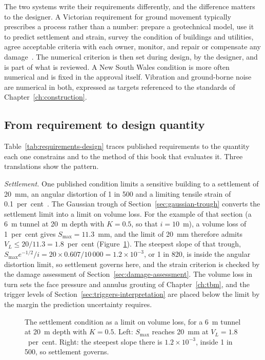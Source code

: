 The two systems write their requirements differently, and the difference
matters to the designer. A Victorian requirement for ground movement typically
prescribes a process rather than a number: prepare a geotechnical model, use
it to predict settlement and strain, survey the condition of buildings and
utilities, agree acceptable criteria with each owner, monitor, and repair or
compensate any damage~\citep{wda2017ees,dtp2022srlassessment}. The numerical
criterion is then set during design, by the designer, and is part of what is
reviewed. A New South Wales condition is more often numerical and is fixed in
the approval itself. Vibration and ground-borne noise are numerical in both,
expressed as targets referenced to the standards of
Chapter~\ref{ch:construction}.

\subsection{From requirement to design quantity}
\label{sec:requirement-to-design}

Table~\ref{tab:requirements-design} traces published requirements to the
quantity each one constrains and to the method of this book that evaluates it.
Three translations show the pattern.

\emph{Settlement.} One published condition limits a sensitive building to a
settlement of 20~mm, an angular distortion of 1 in 500 and a limiting tensile
strain of 0.1~per~cent~\citep{nsw2020m4m5coa}. The Gaussian trough of
Section~\ref{sec:gaussian-trough} converts the settlement limit into a limit on
volume loss. For the example of that section (a 6~m tunnel at 20~m depth
with $K = 0.5$, so that $i = 10$~m), a volume loss of 1~per~cent gives
$S_{\max} = 11.3$~mm, and the limit of 20~mm therefore admits
$V_L \leq 20/11.3 = 1.8$~per~cent (Figure~\ref{fig:settlement-volume-loss}). The steepest slope of that trough,
$S_{\max} e^{-1/2}/i = 20 \times 0.607/10\,000 = 1.2 \times 10^{-3}$, or
1 in 820, is inside the angular distortion limit, so settlement governs here,
and the strain criterion is checked by the damage assessment of
Section~\ref{sec:damage-assessment}. The volume loss in turn sets the face
pressure and annulus grouting of Chapter~\ref{ch:tbm}, and the trigger levels of
Section~\ref{sec:triggers-interpretation} are placed below the limit by the
margin the prediction uncertainty requires.

\begin{figure}[htbp]
\centering
{}
\caption{The settlement condition as a limit on volume loss, for a 6~m tunnel at 20~m depth with $K = 0.5$. Left: $S_{\max}$ reaches 20~mm at $V_L = 1.8$~per~cent. Right: the steepest slope there is $1.2 \times 10^{-3}$, inside 1 in 500, so settlement governs.}
\label{fig:settlement-volume-loss}
\end{figure}

